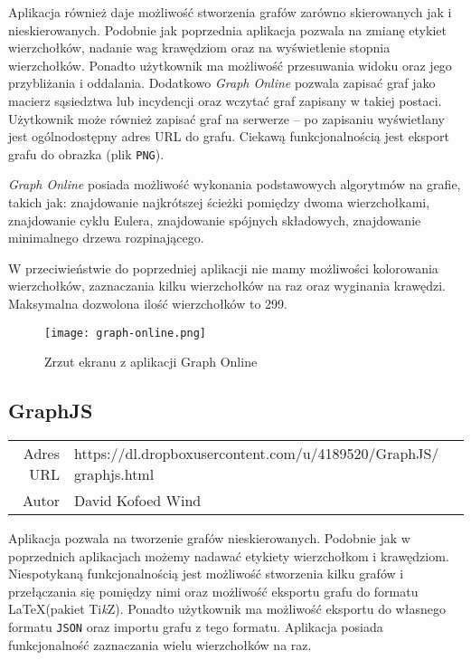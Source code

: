 Aplikacja również daje możliwość stworzenia grafów zarówno skierowanych jak i nieskierowanych. Podobnie jak poprzednia aplikacja pozwala na zmianę etykiet wierzchołków, nadanie wag krawędziom oraz na wyświetlenie stopnia wierzchołków. Ponadto użytkownik ma możliwość przesuwania widoku oraz jego przybliżania i oddalania. Dodatkowo \textit{Graph Online} pozwala zapisać graf jako macierz sąsiedztwa lub incydencji oraz wczytać graf zapisany w takiej postaci. Użytkownik może również zapisać graf na serwerze -- po zapisaniu wyświetlany jest ogólnodostępny adres URL do grafu. Ciekawą funkcjonalnością jest eksport grafu do obrazka (plik \texttt{PNG}).

\textit{Graph Online} posiada możliwość wykonania podstawowych algorytmów na grafie, takich jak: znajdowanie najkrótszej ścieżki pomiędzy dwoma wierzchołkami, znajdowanie cyklu Eulera, znajdowanie spójnych składowych, znajdowanie minimalnego drzewa rozpinającego.  

W przeciwieństwie do poprzedniej aplikacji nie mamy możliwości kolorowania wierzchołków, zaznaczania kilku wierzchołków na raz oraz wyginania krawędzi. Maksymalna dozwolona ilość wierzchołków to 299. 

\begin{figure}[H]
\caption{Zrzut ekranu z aplikacji Graph Online}
\centering
\texttt{[image: graph-online.png]}
\end{figure}

\subsection*{GraphJS}
\bigskip
\noindent\begin{tabularx}{\textwidth}{r|X|}
\cline{2-2}
  Adres URL & https://dl.dropboxusercontent.com/u/4189520/GraphJS/ graphjs.html \\ 
\cline{2-2} 
 Autor & David Kofoed Wind \\ 
\cline{2-2}
\end{tabularx}
\bigskip

Aplikacja pozwala na tworzenie grafów nieskierowanych. Podobnie jak w poprzednich aplikacjach możemy nadawać etykiety wierzchołkom i krawędziom. Niespotykaną funkcjonalnością jest możliwość stworzenia kilku grafów i przełączania się pomiędzy nimi oraz możliwość eksportu grafu do formatu \LaTeX (pakiet Ti\textit{k}Z). Ponadto użytkownik ma możliwość eksportu do własnego formatu \texttt{JSON} oraz importu grafu z tego formatu. Aplikacja posiada funkcjonalność zaznaczania wielu wierzchołków na raz.

